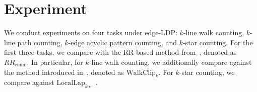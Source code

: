 \section{Experiment}
\label{sec:exp}


We conduct experiments on four tasks under edge-LDP: 
$k$-line walk counting, 
$k$-line path counting,
$k$-edge acyclic pattern counting, 
and $k$-star counting. 
{For the first three tasks, we compare with the RR-based method from~\cite{suppakitpaisarn2025counting}, denoted as $RR_{\text{enum}}$.
}
{In particular, for $k$-line walk counting, we additionally compare against the method introduced in~\cite{betzer2024publishing}, denoted as $\mathrm{WalkClip}_k$.
}
For $k$-star counting, we compare against $\mathrm{LocalLap}_{k\star}$~\cite{Imola2021}. 








